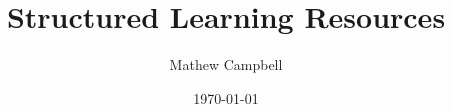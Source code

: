 \documentclass[a4paper]{report}
\title{Structured Learning Resources}
\subtitle{}%
\author{Mathew Campbell}
\date{\today}
\begin{document}
  \makeTYPTitle

  

  \tableofcontents

  
  
  
  
  
  
  

  

  
\end{document}
